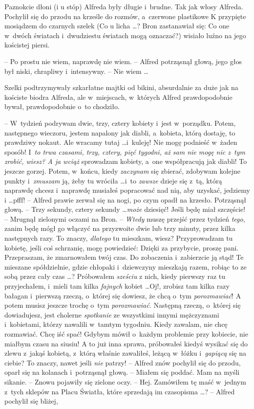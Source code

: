 \documentclass[oneside,polish,11pt,rmheadings]{mwbk}
\begin{document}
\bigskip

Paznokcie dłoni (i u stóp) Alfreda były długie i~brudne. Tak jak włosy Alfreda. Pochylił się do przodu na krześle do rozmów, a~czerwone plastikowe K przypięte mosiądzem do czarnych szelek (Co u licha \ldots ? Bron zastanawiał się: Co one w~dwóch światach i~dwudziestu światach mogą oznaczać?) wisiało luźno na jego kościstej piersi. 

-- Po prostu nie wiem, naprawdę nie wiem. -- Alfred potrząsnął głową, jego głos był niski, chrapliwy i~intensywny. -- Nie wiem \ldots  

Szelki podtrzymywały szkarłatne majtki od bikini, absurdalnie za duże jak na kościste biodra Alfreda, ale w~miejscach, w~których Alfred prawdopodobnie bywał, prawdopodobnie o~to chodziło. 

-- W~tydzień podrywam dwie, trzy, cztery kobiety i~jest w~porządku. Potem, następnego wieczoru, jestem napalony jak diabli, a~kobieta, którą dostaję, to prawdziwy nokaut. Ale wracamy tutaj \ldots  i~kuleję! Nie mogę podnieść w~żaden sposób! I~\textit{to trwa czasami, trzy, cztery, pięć tygodni, aż sam nie mogę nic z~tym zrobić, wiesz? A ja wciąż }sprowadzam kobiety, a~one współpracują jak diabli! To jeszcze gorzej. Potem, w~końcu, kiedy \textit{zaczynam }się zbierać, zdobywam kolejne punkty i~\textit{zmuszam }ją, żeby tu wróciła \ldots  i~to \textit{zawsze }dzieje się z~tą, którą naprawdę chcesz i~naprawdę musiałeś popracować nad nią, aby uzyskać, jedziemy i \ldots  pfff! -- Alfred prawie zerwał się na nogi, po czym opadł na krzesło. Potrząsnął głową. -- Trzy sekundy, cztery sekundy \ldots  \textit{może }dziesięć! Jeśli będę miał szczęście! -- Mrugnął zielonymi oczami na Bron. -- \textit{Wtedy }muszę przejść przez tydzień \textit{tego}, zanim będę mógł go włączyć na przyzwoite dwie lub trzy minuty, przez kilka następnych razy. To znaczy, \textit{dlatego} tu mieszkam, wiesz? Przyprowadzam tu kobietę, jeśli coś schrzanię, mogę powiedzieć: Dzięki za przybycie, proszę pani. Przepraszam, że zmarnowałem twój czas. Do zobaczenia i~zabierzcie ją stąd! Te mieszane spółdzielnie, gdzie chłopaki i~dziewczyny mieszkają razem, robiąc to ze sobą przez cały czas \ldots ? Próbowałem \textit{sześciu }z nich, kiedy pierwszy raz tu przyjechałem, i~mieli tam kilka \textit{fajnych }kobiet \ldots  Oj!, zrobisz tam kilka razy bałagan i~pierwszą rzeczą, o~której się dowiesz, że chcą o~tym \textit{porozmawiać}! A potem musisz jeszcze trochę o~tym \textit{porozmawiać. }Następną rzeczą, o~której się dowiadujesz, jest cholerne \textit{spotkanie } ze wszystkimi innymi mężczyznami i~kobietami, którzy nawalili w~tamtym tygodniu. Kiedy zawalam, nie chcę rozmawiać. Chcę iść spać! Gdybym mówił o~każdym problemie przy kobiecie, nie miałbym czasu na siusiu! A to już inna sprawa, próbowałeś kiedyś wysikać się do zlewu z~jakąś kobietą, z~którą właśnie zawaliłeś, leżącą w~łóżku i~\textit{gapiącą }się na ciebie? To znaczy, nawet jeśli \textit{nie }patrzy! -- Alfred znów pochylił się do przodu, oparł się na kolanach i~potrząsnął głową. -- Miałem się poddać. Mam na myśli sikanie. -- Znowu pojawiły się zielone oczy. -- Hej. Zamówiłem tę maść w~jednym z~tych sklepów na Placu Światła, które sprzedają im czasopisma \ldots ? -- Alfred pochylił się bliżej, 
\end{document}
